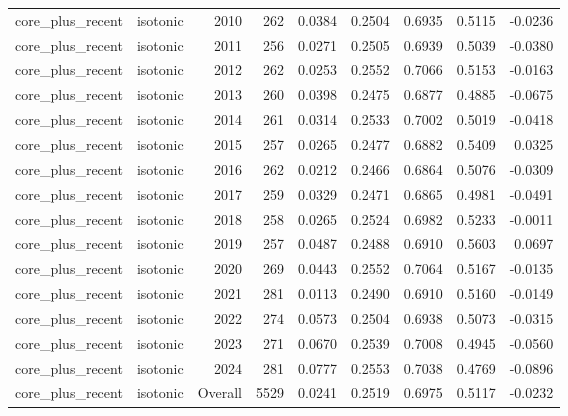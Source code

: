 \begin{table}[t]
\begin{tabular}{@{} l l r r r r r r r @{} }
      core\_plus\_recent & isotonic & 2010 & 262 & 0.0384 & 0.2504 & 0.6935 & 0.5115 & -0.0236 \\
      core\_plus\_recent & isotonic & 2011 & 256 & 0.0271 & 0.2505 & 0.6939 & 0.5039 & -0.0380 \\
      core\_plus\_recent & isotonic & 2012 & 262 & 0.0253 & 0.2552 & 0.7066 & 0.5153 & -0.0163 \\
      core\_plus\_recent & isotonic & 2013 & 260 & 0.0398 & 0.2475 & 0.6877 & 0.4885 & -0.0675 \\
      core\_plus\_recent & isotonic & 2014 & 261 & 0.0314 & 0.2533 & 0.7002 & 0.5019 & -0.0418 \\
      core\_plus\_recent & isotonic & 2015 & 257 & 0.0265 & 0.2477 & 0.6882 & 0.5409 & 0.0325 \\
      core\_plus\_recent & isotonic & 2016 & 262 & 0.0212 & 0.2466 & 0.6864 & 0.5076 & -0.0309 \\
      core\_plus\_recent & isotonic & 2017 & 259 & 0.0329 & 0.2471 & 0.6865 & 0.4981 & -0.0491 \\
      core\_plus\_recent & isotonic & 2018 & 258 & 0.0265 & 0.2524 & 0.6982 & 0.5233 & -0.0011 \\
      core\_plus\_recent & isotonic & 2019 & 257 & 0.0487 & 0.2488 & 0.6910 & 0.5603 & 0.0697 \\
      core\_plus\_recent & isotonic & 2020 & 269 & 0.0443 & 0.2552 & 0.7064 & 0.5167 & -0.0135 \\
      core\_plus\_recent & isotonic & 2021 & 281 & 0.0113 & 0.2490 & 0.6910 & 0.5160 & -0.0149 \\
      core\_plus\_recent & isotonic & 2022 & 274 & 0.0573 & 0.2504 & 0.6938 & 0.5073 & -0.0315 \\
      core\_plus\_recent & isotonic & 2023 & 271 & 0.0670 & 0.2539 & 0.7008 & 0.4945 & -0.0560 \\
      core\_plus\_recent & isotonic & 2024 & 281 & 0.0777 & 0.2553 & 0.7038 & 0.4769 & -0.0896 \\
      core\_plus\_recent & isotonic & Overall & 5529 & 0.0241 & 0.2519 & 0.6975 & 0.5117 & -0.0232 \\
    \bottomrule
  \end{tabular}
\end{table}
